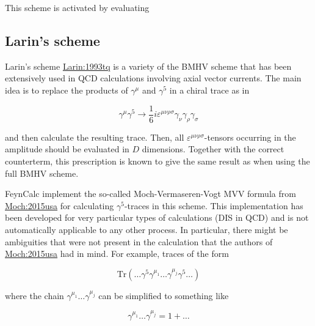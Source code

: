 \documentclass[../FeynCalcManual.tex]{subfiles}
\begin{document}
This scheme is activated by evaluating

\begin{Shaded}
\begin{Highlighting}[]
\OperatorTok{[}\OperatorTok{]}
\end{Highlighting}
\end{Shaded}

\subsection{Larin's scheme}\label{larins-scheme}

Larin's scheme
\href{https://arxiv.org/pdf/hep-ph/9302240.pdf}{Larin:1993tq} is a
variety of the BMHV scheme that has been extensively used in QCD
calculations involving axial vector currents. The main idea is to
replace the products of \(\gamma^\mu\) and \(\gamma^5\) in a chiral
trace as in

\begin{equation}
\gamma^\mu \gamma^5 \to \frac{1}{6} i \varepsilon^{\mu \nu \rho \sigma} \gamma_\nu \gamma_\rho \gamma_\sigma
\end{equation}

and then calculate the resulting trace. Then, all
\(\varepsilon^{\mu \nu \rho \sigma}\)-tensors occurring in the amplitude
should be evaluated in \(D\) dimensions. Together with the correct
counterterm, this prescription is known to give the same result as when
using the full BMHV scheme.

FeynCalc implement the so-called Moch-Vermaseren-Vogt MVV formula from
\href{https://arxiv.org/pdf/1506.04517.pdf}{Moch:2015usa} for
calculating \(\gamma^5\)-traces in this scheme. This implementation has
been developed for very particular types of calculations (DIS in QCD)
and is not automatically applicable to any other process. In particular,
there might be ambiguities that were not present in the calculation that
the authors of \href{https://arxiv.org/pdf/1506.04517.pdf}{Moch:2015usa}
had in mind. For example, traces of the form

\begin{equation}
\mathrm{Tr}(\ldots \gamma^5 \gamma^{\mu_1} \ldots \gamma^{\mu_j} \gamma^5 \ldots )
\end{equation}

where the chain \(\gamma^{\mu_{1}} \ldots \gamma^{\mu_{j}}\) can be
simplified to something like

\begin{equation}
\gamma^{\mu_{1}} \ldots \gamma^{\mu_{j}} = 1 + \ldots
\end{equation}
\end{document}
